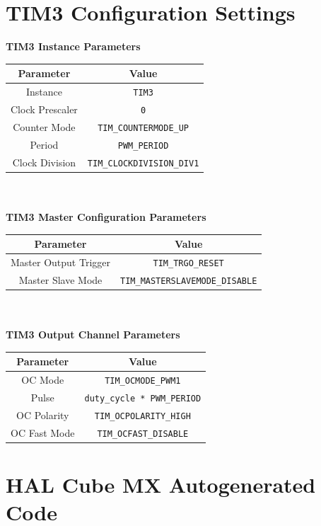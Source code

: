 \documentclass[12pt]{report}
\begin{document}
\begin{appendix}
	\chapter{TIM3 Configuration Settings}\label{appendixtim3}
	\textbf{TIM3 Instance Parameters}\\
	\begin{tabular}{|c|c|}
		\hline
		Parameter & Value\\\hline
		Instance & \texttt{TIM3}\\\hline
		Clock Prescaler & \texttt{0}\\\hline
		Counter Mode & \texttt{TIM\_COUNTERMODE\_UP}\\\hline
		Period & \texttt{PWM\_PERIOD}\\\hline
		Clock Division & \texttt{TIM\_CLOCKDIVISION\_DIV1}\\\hline
	\end{tabular}
	\newline
	\\\\
	\textbf{TIM3 Master Configuration Parameters}\\
	\begin{tabular}{|c|c|}
		\hline
		Parameter & Value\\\hline
		Master Output Trigger & \texttt{TIM\_TRGO\_RESET}\\\hline
		Master Slave Mode & \texttt{TIM\_MASTERSLAVEMODE\_DISABLE}\\\hline
	\end{tabular}
	\newline
	\\\\
	\textbf{TIM3 Output Channel Parameters}\\
	\begin{tabular}{|c|c|}
		\hline
		Parameter & Value\\\hline
		OC Mode & \texttt{TIM\_OCMODE\_PWM1}\\\hline
		Pulse & \texttt{duty\_cycle * PWM\_PERIOD}\\\hline
		OC Polarity & \texttt{TIM\_OCPOLARITY\_HIGH}\\\hline
		OC Fast Mode & \texttt{TIM\_OCFAST\_DISABLE}\\\hline
	\end{tabular}	
	\newpage
	
	\chapter{HAL Cube MX Autogenerated Code}\label{mammoth}
	\begin{lstlisting}[basicstyle=\scriptsize\ttfamily]
	

\end{lstlisting}
\end{appendix}
\end{document}
